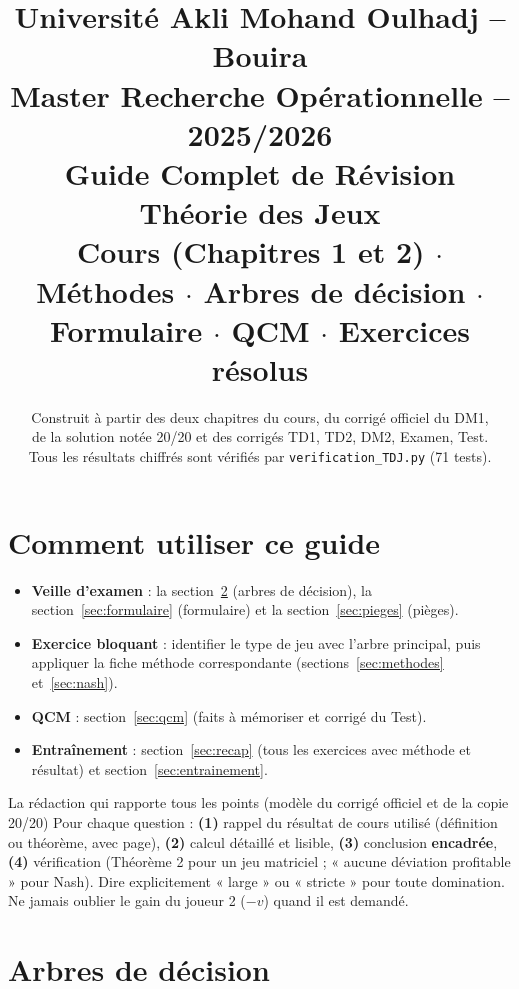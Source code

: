 \documentclass[11pt,a4paper]{article}
\title{\textbf{Université Akli Mohand Oulhadj -- Bouira}\\
\large Master Recherche Opérationnelle -- 2025/2026\\[3mm]
\Huge \textbf{Guide Complet de Révision}\\[2mm]
\Large \textbf{Théorie des Jeux}\\[2mm]
\normalsize Cours (Chapitres 1 et 2) $\cdot$ Méthodes $\cdot$ Arbres de décision $\cdot$ Formulaire $\cdot$ QCM $\cdot$ Exercices résolus}
\author{Construit à partir des deux chapitres du cours, du corrigé officiel du DM1,\\ de la solution notée 20/20 et des corrigés TD1, TD2, DM2, Examen, Test.\\ Tous les résultats chiffrés sont vérifiés par \texttt{verification\_TDJ.py} (71 tests).}
\date{}
\begin{document}
\maketitle
\thispagestyle{empty}
\tableofcontents
\newpage

\section{Comment utiliser ce guide}
\begin{itemize}
\item \textbf{Veille d'examen} : la section~\ref{sec:arbres} (arbres de décision), la section~\ref{sec:formulaire} (formulaire) et la section~\ref{sec:pieges} (pièges).
\item \textbf{Exercice bloquant} : identifier le type de jeu avec l'arbre principal, puis appliquer la fiche méthode correspondante (sections~\ref{sec:methodes} et~\ref{sec:nash}).
\item \textbf{QCM} : section~\ref{sec:qcm} (faits à mémoriser et corrigé du Test).
\item \textbf{Entraînement} : section~\ref{sec:recap} (tous les exercices avec méthode et résultat) et section~\ref{sec:entrainement}.
\end{itemize}

\begin{rembox}{La rédaction qui rapporte tous les points (modèle du corrigé officiel et de la copie 20/20)}
Pour chaque question : \textbf{(1)} rappel du résultat de cours utilisé (définition ou théorème, avec page), \textbf{(2)} calcul détaillé et lisible, \textbf{(3)} conclusion \textbf{encadrée}, \textbf{(4)} vérification (Théorème 2 pour un jeu matriciel ; « aucune déviation profitable » pour Nash). Dire explicitement « large » ou « stricte » pour toute domination. Ne jamais oublier le gain du joueur 2 ($-v$) quand il est demandé.
\end{rembox}

\section{Arbres de décision}\label{sec:arbres}
\end{document}
